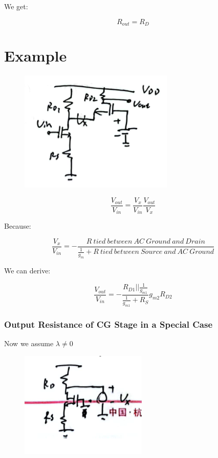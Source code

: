 \documentclass[fontset=windows]{article}
\begin{document}
We get: 

$$R_{out}=R_D$$

\section*{Example}

\begin{figure}[htbp]
    \centering
    \includegraphics[scale=0.8]{6.jpg}
    \captionsetup{labelformat=empty}
    \caption{}
    \label{6}
\end{figure}

$$\frac{V_{out}}{V_{in}}=\frac{V_x}{V_{in}}\frac{V_{out}}{V_x}$$

Because: 

$$\frac{V_x}{V_{in}}=-\frac{R\ tied\ between\ AC\ Ground\ and\ Drain}{\frac{1}{g_m}+R\ tied\ between\ Source\ and\ AC\ Ground}$$

We can derive: 

$$\frac{V_{out}}{V_{in}}=-\frac{R_{D1}||\frac{1}{g_{m1}}}{\frac{1}{g_{m1}}+R_S}g_{m2}R_{D2}$$

\subsubsection*{Output Resistance of CG Stage in a Special Case}

Now we assume $\lambda \neq 0$

\begin{figure}[htbp]
    \centering
    \includegraphics[scale=0.8]{7.jpg}
    \captionsetup{labelformat=empty}
    \caption{}
    \label{7}
\end{figure}
\end{document}
